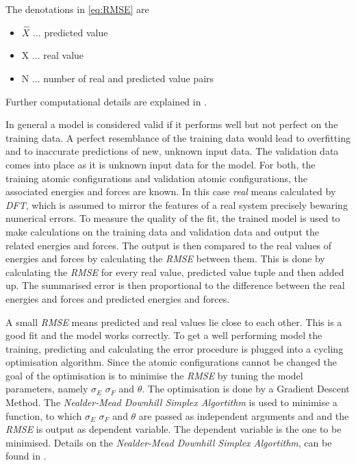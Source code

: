 The denotations in \ref{eq:RMSE} are

\begin{itemize}
	\item $\hat{X}$ ... predicted value 
	\item X ... real value
	\item N ... number of real and predicted value pairs
\end{itemize}


Further computational details are explained in \cite{RMSE}.


In general a model is considered valid if it performs well but not perfect on the training data. A perfect resemblance of the training data would lead to overfitting and to inaccurate predictions of new, unknown input data. The validation data comes into place as it is unknown input data for the model. For both, the training atomic configurations and validation atomic configurations, the associated energies and forces are known. In this case \textit{real} means calculated by \textit{DFT}, which is assumed to mirror the features of a real system precisely bewaring numerical errors. To measure  the quality of the fit, the trained model is used to make calculations on the training data and validation data and output the related energies and forces. The output is then compared to the real values of energies and forces by calculating the \textit{RMSE} between them. This is done by calculating the \textit{RMSE} for every real value, predicted value tuple and then added up. The summarised error is then proportional to the difference between the real energies and forces and predicted energies and forces. 

A small \textit{RMSE} means predicted and real values lie close to each other. This is a good fit and the model works correctly. To get a well performing model the training, predicting and calculating the error procedure is plugged into a cycling optimisation algorithm. Since the atomic configurations cannot be changed the goal of the optimisation is to minimise the \textit{RMSE} by tuning the model parameters, namely  $\sigma_E$ $\sigma_F$ and $\theta$. The optimisation is done by a Gradient Descent Method. The \textit{Nealder-Mead Downhill Simplex Algortithm} is used to minimise a function, to which  $\sigma_E$ $\sigma_F$ and $\theta$ are passed as independent arguments and and the \textit{RMSE} is output as dependent variable. The dependent variable is the one to be minimised. Details on the \textit{Nealder-Mead Downhill Simplex Algortithm}, can be found in \cite{nealder-mead}.

